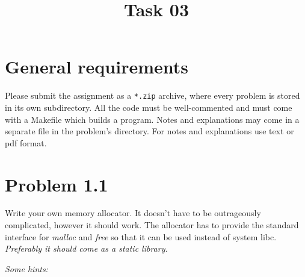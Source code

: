 \documentclass[a4paper,10pt]{scrartcl}
\title{ 
    Task 03
}
\date{}
\begin{document}
    \maketitle
    \thispagestyle{fancy}

    \section*{General requirements}
    Please submit the assignment as a \verb|*.zip| archive, where every
    problem is stored in its own subdirectory.  All the code must be
    well-commented and must come with a Makefile which builds a program.
    Notes and explanations may come in a separate file in the problem's
    directory.  For notes and explanations use text or pdf format.

 
    \section{Problem 1.1}
    Write your own memory allocator.  It doesn't have to be outrageously
    complicated, however it should work.  The allocator has to provide
    the standard interface for \textit{malloc} and \textit{free} so that it can be used 
    instead of system libc.  \textit{\small Preferably it should come
    as a static library.}

    
    \textsl{Some hints:}  
\end{document}
